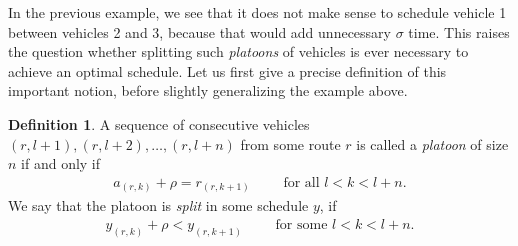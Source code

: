 \documentclass[a4paper]{article}
\theoremstyle{definition}
\newtheorem{define}{Definition}[section]
\theoremstyle{plain}
\begin{document}
In the previous example, we see that it does not make sense to schedule vehicle
1 between vehicles 2 and 3, because that would add unnecessary $\sigma$ time.
This raises the question whether splitting such \textit{platoons} of vehicles is
ever necessary to achieve an optimal schedule. Let us first give a precise
definition of this important notion, before slightly generalizing the example
above.
%
\begin{define}
  A sequence of consecutive vehicles $(r, l+1), (r, l+2), \dots, (r, l+n)$ from
  some route $r$ is called a \textit{platoon} of size $n$ if and only if
  \begin{align*}
  a_{(r,k)} + \rho = r_{(r, k+1)}  \quad \quad \text{ for all } l < k < l + n.
  \end{align*}
 We say that the platoon is \textit{split}
  in some schedule $y$, if
  \begin{align*}
  y_{(r, k)} + \rho < y_{(r, k + 1)} \quad \quad \text{ for some } l < k < l + n.
  \end{align*}
\end{define}
%
\end{document}
